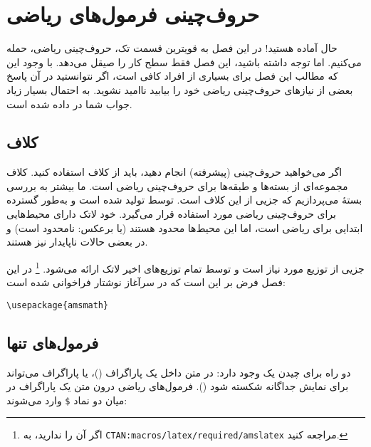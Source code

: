 \chapter{حروف‌چینی فرمول‌های ریاضی}


\begin{intro}

حال آماده هستید! در این فصل به قویترین قسمت تک، حروف‌چینی ریاضی، حمله می‌کنیم. اما توجه داشته باشید، این فصل فقط سطح کار را صیقل می‌دهد. با ‌وجود این که مطالب این فصل برای بسیاری از افراد کافی است، اگر نتوانستید در آن پاسخ بعضی از نیازهای حروف‌چینی ریاضی خود را بیابید نا‌امید نشوید. به احتمال بسیار زیاد جواب شما در  \lr{\AmS-\LaTeX{}} داده شده است.
\end{intro}
\section{\texorpdfstring{کلاف }{کلاف AMS-Latex}}
اگر می‌خواهید حروف‌چینی (پیشرفته)
انجام دهید، باید از کلاف 
\lr{\AmS-\LaTeX} 
استفاده کنید. کلاف 
\lr{\AmS-\LaTeX} 
مجموعه‌ای از بسته‌ها و طبقه‌ها برای حروف‌چینی ریاضی است. ما بیشتر به بررسی بستۀ 
می‌پردازیم که جزیی از این کلاف است. 
\lr{\AmS-\LaTeX} 
توسط  تولید شده است و به‌طور گسترده برای حروف‌چینی ریاضی مورد استفاده قرار می‌گیرد. خود لاتک دارای محیط‌هایی ابتدایی برای ریاضی است، اما این محیط‌ها محدود هستند 
(یا برعکس: \lr{\AmS-\LaTeX} نامحدود است)
و در بعضی حالات ناپایدار نیز هستند.

\lr{\AmS-\LaTeX} 
جزیی از توزیع مورد نیاز است و توسط تمام توزیع‌های اخیر لاتک ارائه می‌شود.%
\footnote{اگر آن را ندارید، به 
  \texttt{CTAN:macros/latex/required/amslatex} مراجعه کنید.} 
در این فصل فرض بر این است که  در سرآغاز نوشتار‌ فراخوانی شده است:

\begin{code}
\verb|\usepackage{amsmath}|
\end{code}
\section{فرمول‌های تنها}

دو راه برای چیدن یک  وجود دارد: در متن داخل یک پاراگراف 
()، 
یا پاراگراف می‌تواند برای نمایش جداگانه شکسته شود 
(). 
فرمول‌های ریاضی {\femph درون} 
متن  یک پاراگراف در میان دو نماد  \texttt{\$} وارد می‌شوند:


